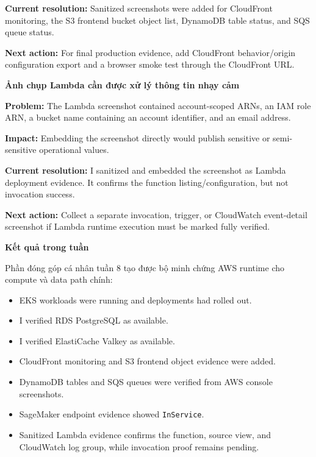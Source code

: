 \textbf{Current resolution:} Sanitized screenshots were added for
CloudFront monitoring, the S3 frontend bucket object list, DynamoDB
table status, and SQS queue status.

\textbf{Next action:} For final production evidence, add CloudFront
behavior/origin configuration export and a browser smoke test through
the CloudFront URL.

\vspace{0.5em}\noindent\textbf{Ảnh chụp Lambda cần được xử lý thông tin nhạy
cảm}\par

\textbf{Problem:} The Lambda screenshot contained account-scoped ARNs,
an IAM role ARN, a bucket name containing an account identifier, and an
email address.

\textbf{Impact:} Embedding the screenshot directly would publish
sensitive or semi-sensitive operational values.

\textbf{Current resolution:} I sanitized and embedded the screenshot as
Lambda deployment evidence. It confirms the function
listing/configuration, but not invocation success.

\textbf{Next action:} Collect a separate invocation, trigger, or
CloudWatch event-detail screenshot if Lambda runtime execution must be
marked fully verified.

\vspace{0.5em}\noindent\textbf{Kết quả trong tuần}\par

Phần đóng góp cá nhân tuần 8 tạo được bộ minh chứng AWS runtime cho
compute và data path chính:

\begin{itemize}
\tightlist
\item
  EKS workloads were running and deployments had rolled out.
\item
  I verified RDS PostgreSQL as available.
\item
  I verified ElastiCache Valkey as available.
\item
  CloudFront monitoring and S3 frontend object evidence were added.
\item
  DynamoDB tables and SQS queues were verified from AWS console
  screenshots.
\item
  SageMaker endpoint evidence showed \texttt{InService}.
\item
  Sanitized Lambda evidence confirms the function, source view, and
  CloudWatch log group, while invocation proof remains pending.
\end{itemize}


